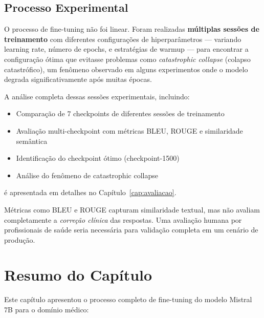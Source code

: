 \subsection{Processo Experimental}

O processo de fine-tuning não foi linear. Foram realizadas \textbf{múltiplas sessões de treinamento} com diferentes configurações de hiperparâmetros --- variando learning rate, número de epochs, e estratégias de warmup --- para encontrar a configuração ótima que evitasse problemas como \textit{catastrophic collapse} (colapso catastrófico), um fenômeno observado em alguns experimentos onde o modelo degrada significativamente após muitas épocas.

A análise completa dessas sessões experimentais, incluindo:
\begin{itemize}
    \item Comparação de 7 checkpoints de diferentes sessões de treinamento
    \item Avaliação multi-checkpoint com métricas BLEU, ROUGE e similaridade semântica
    \item Identificação do checkpoint ótimo (checkpoint-1500)
    \item Análise do fenômeno de catastrophic collapse
\end{itemize}

\noindent é apresentada em detalhes no Capítulo~\ref{cap:avaliacao}.

\begin{infobox}
Métricas como BLEU e ROUGE capturam similaridade textual, mas não avaliam completamente a \textit{correção clínica} das respostas. Uma avaliação humana por profissionais de saúde seria necessária para validação completa em um cenário de produção.
\end{infobox}

\section{Resumo do Capítulo}

Este capítulo apresentou o processo completo de fine-tuning do modelo Mistral 7B para o domínio médico:

